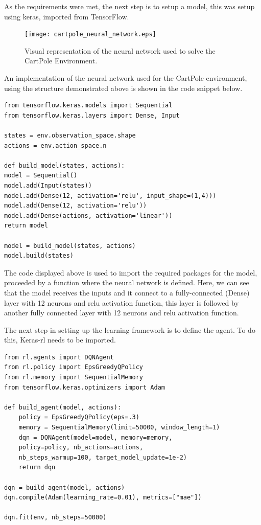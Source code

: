     As the requirements were met, the next step is to setup a model, this was setup using keras, imported from TensorFlow.
\begin{figure}[H]
    \centering
    \texttt{[image: cartpole\_neural\_network.eps]}
    \caption{Visual representation of the neural network used to solve the CartPole Environment. }
    \label{fig:cartpole_neural_network}
\end{figure}
An implementation of the neural network used for the CartPole environment, using the structure demonstrated above is shown in the code snippet below.

\lstset{language=Python}
\lstset{frame=lines}
\lstset{basicstyle=\footnotesize}
\begin{lstlisting}
from tensorflow.keras.models import Sequential
from tensorflow.keras.layers import Dense, Input

states = env.observation_space.shape
actions = env.action_space.n

def build_model(states, actions):
model = Sequential() 
model.add(Input(states))
model.add(Dense(12, activation='relu', input_shape=(1,4)))
model.add(Dense(12, activation='relu'))
model.add(Dense(actions, activation='linear'))
return model

model = build_model(states, actions)
model.build(states)
\end{lstlisting}
    
    The code displayed above is used to import the required packages for the model, proceeded by a function where the neural network is defined. Here, we can see that the model receives the inputs and it connect to a fully-connected (Dense) layer with 12 neurons and relu activation function,
    this layer is followed by another fully connected layer with 12 neurons and relu activation function.
    
    The next step in setting up the learning framework is to define the agent. To do this, Keras-rl needs to be imported.
    
\lstset{language=Python}
\lstset{frame=lines}
\lstset{basicstyle=\footnotesize}
\begin{lstlisting}
from rl.agents import DQNAgent
from rl.policy import EpsGreedyQPolicy
from rl.memory import SequentialMemory          
from tensorflow.keras.optimizers import Adam

def build_agent(model, actions):
    policy = EpsGreedyQPolicy(eps=.3)
    memory = SequentialMemory(limit=50000, window_length=1)
    dqn = DQNAgent(model=model, memory=memory, 
    policy=policy, nb_actions=actions, 
    nb_steps_warmup=100, target_model_update=1e-2)
    return dqn

dqn = build_agent(model, actions)
dqn.compile(Adam(learning_rate=0.01), metrics=["mae"])

dqn.fit(env, nb_steps=50000)
\end{lstlisting}

